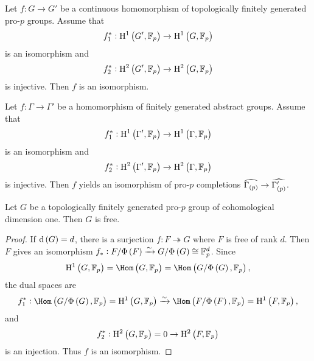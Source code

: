 \begin{theorem}
\label{thm:5.4.20}
Let $ f : G \to G' $ be a continuous homomorphism of topologically finitely generated pro-$ p $ groups. Assume that
$$ f_1^* : \H^1\br{G', \FF_p} \to \H^1\br{G, \FF_p} $$
is an isomorphism and
$$ f_2^* : \H^2\br{G', \FF_p} \to \H^2\br{G, \FF_p} $$
is injective. Then $ f $ is an isomorphism.
\end{theorem}

\begin{corollary}
Let $ f : \Gamma \to \Gamma' $ be a homomorphism of finitely generated abstract groups. Assume that
$$ f_1^* : \H^1\br{\Gamma', \FF_p} \to \H^1\br{\Gamma, \FF_p} $$
is an isomorphism and
$$ f_2^* : \H^2\br{\Gamma', \FF_p} \to \H^2\br{\Gamma, \FF_p} $$
is injective. Then $ f $ yields an isomorphism of pro-$ p $ completions $ \widehat{\Gamma_{\br{p}}} \to \widehat{\Gamma_{\br{p}}'} $.
\end{corollary}

\pagebreak

\begin{corollary}
Let $ G $ be a topologically finitely generated pro-$ p $ group of cohomological dimension one. Then $ G $ is free.
\end{corollary}

\begin{proof}
If $ \d\br{G} = d $, there is a surjection $ f : F \twoheadrightarrow G $ where $ F $ is free of rank $ d $. Then $ F $ gives an isomorphism $ f_* : F / \Phi\br{F} \xrightarrow{\sim} G / \Phi\br{G} \cong \FF_p^d $. Since
$$ \H^1\br{G, \FF_p} = \Hom\br{G, \FF_p} = \Hom\br{G / \Phi\br{G}, \FF_p}, $$
the dual spaces are
$$ f_1^* : \Hom\br{G / \Phi\br{G}, \FF_p} = \H^1\br{G, \FF_p} \xrightarrow{\sim} \Hom\br{F / \Phi\br{F}, \FF_p} = \H^1\br{F, \FF_p}, $$
and
$$ f_2^* : \H^2\br{G, \FF_p} = 0 \to \H^2\br{F, \FF_p} $$
is an injection. Thus $ f $ is an isomorphism.
\end{proof}



